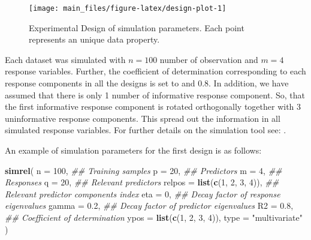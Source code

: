 \documentclass[12pt,3p,authoryear]{elsarticle}
\newenvironment{Shaded}{\begin{snugshade}}{\end{snugshade}}
\newcommand{\CommentTok}[1]{\textcolor[rgb]{0.56,0.35,0.01}{\textit{#1}}}
\newcommand{\DataTypeTok}[1]{\textcolor[rgb]{0.13,0.29,0.53}{#1}}
\newcommand{\DecValTok}[1]{\textcolor[rgb]{0.00,0.00,0.81}{#1}}
\newcommand{\FloatTok}[1]{\textcolor[rgb]{0.00,0.00,0.81}{#1}}
\newcommand{\KeywordTok}[1]{\textcolor[rgb]{0.13,0.29,0.53}{\textbf{#1}}}
\newcommand{\NormalTok}[1]{#1}
\newcommand{\StringTok}[1]{\textcolor[rgb]{0.31,0.60,0.02}{#1}}
\providecommand{\tightlist}{%
  \setlength{\itemsep}{0pt}\setlength{\parskip}{0pt}}
\begin{document}
\begin{figure}
\texttt{[image: main\_files/figure-latex/design-plot-1]} \caption{Experimental Design of simulation parameters. Each point represents an unique data property.}\label{fig:design-plot}
\end{figure}

\begin{description}
\tightlist
\item[\textbf{Common parameters:}]
Each dataset was simulated with \(n = 100\) number of observation and
\(m = 4\) response variables. Further, the coefficient of determination
corresponding to each response components in all the designs is set to
and 0.8. In addition, we have assumed that there is only 1 number of
informative response component. So, that the first informative response
component is rotated orthogonally together with 3 uninformative response
components. This spread out the information in all simulated response
variables. For further details on the simulation tool see:
\citep{Rimal_2018}.
\end{description}

An example of simulation parameters for the first design is as follows:

\begin{Shaded}
\begin{Highlighting}[]
\KeywordTok{simrel}\NormalTok{(}
    \DataTypeTok{n       =} \DecValTok{100}\NormalTok{,                 }\CommentTok{## Training samples}
    \DataTypeTok{p       =} \DecValTok{20}\NormalTok{,                  }\CommentTok{## Predictors}
    \DataTypeTok{m       =} \DecValTok{4}\NormalTok{,                   }\CommentTok{## Responses}
    \DataTypeTok{q       =} \DecValTok{20}\NormalTok{,                  }\CommentTok{## Relevant predictors}
    \DataTypeTok{relpos  =} \KeywordTok{list}\NormalTok{(}\KeywordTok{c}\NormalTok{(}\DecValTok{1}\NormalTok{, }\DecValTok{2}\NormalTok{, }\DecValTok{3}\NormalTok{, }\DecValTok{4}\NormalTok{)), }\CommentTok{## Relevant predictor components index}
    \DataTypeTok{eta     =} \DecValTok{0}\NormalTok{,                   }\CommentTok{## Decay factor of response eigenvalues}
    \DataTypeTok{gamma   =} \FloatTok{0.2}\NormalTok{,                 }\CommentTok{## Decay factor of predictor eigenvalues}
    \DataTypeTok{R2      =} \FloatTok{0.8}\NormalTok{,                 }\CommentTok{## Coefficient of determination}
    \DataTypeTok{ypos    =} \KeywordTok{list}\NormalTok{(}\KeywordTok{c}\NormalTok{(}\DecValTok{1}\NormalTok{, }\DecValTok{2}\NormalTok{, }\DecValTok{3}\NormalTok{, }\DecValTok{4}\NormalTok{)),}
    \DataTypeTok{type    =} \StringTok{"multivariate"}
\NormalTok{)}
\end{Highlighting}
\end{Shaded}
\end{document}
